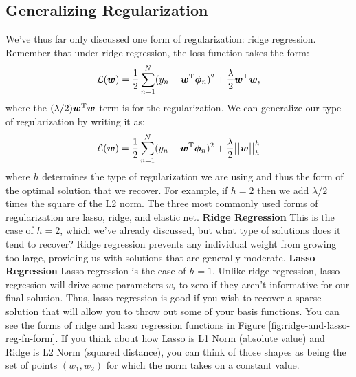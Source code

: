 \subsection{Generalizing Regularization}
We've thus far only discussed one form of regularization: ridge regression. Remember that under ridge regression, the loss function takes the form:
\begin{align*}
    \mathcal{L}(\bm{w}) = \frac{1}{2} \sum_{n=1}^{N} (y_n - \bm{w}^{\mathrm T}\boldsymbol{\phi}_n)^2 + \frac{\lambda}{2}\bm{w}^{\top}\bm{w},
\end{align*}
%
where the $(\lambda/2)\bm{w}^{\mathrm T}\bm{w}$ term is for the regularization. We can generalize our type of regularization by writing it as:
\begin{align*}
    \mathcal{L}(\bm{w}) = \frac{1}{2} \sum_{n=1}^{N} (y_n - \bm{w}^{\mathrm T}\boldsymbol{\phi}_n)^2 + \frac{\lambda}{2}\big|\big|\bm{w}\big|\big|_h^{h}
\end{align*}
where $h$ determines the type of regularization we are using and thus the form of the optimal solution that we recover. For example, if $h=2$ then we add $\lambda/2$ times the square of the L2 norm.
The three most commonly used forms of regularization are lasso, ridge, and elastic net. \newline \newline
\textbf{Ridge Regression} \newline
This is the case of $h = 2$, which we've already discussed, but what type of solutions does it tend to recover? Ridge regression prevents any individual weight from growing too large, providing us with solutions that are generally moderate. \newline \newline
\textbf{Lasso Regression} \newline
Lasso regression is the case of $h = 1$. Unlike ridge regression, lasso regression will drive some parameters $w_i$ to zero if they aren't informative for our final solution. Thus, lasso regression is good if you wish to recover a sparse solution that will allow you to throw out some of your basis functions. You can see the forms of ridge and lasso regression functions in Figure \ref{fig:ridge-and-lasso-reg-fn-form}.
If you think about how Lasso is L1 Norm (absolute value) and Ridge is L2 Norm (squared distance), you can think of those shapes as being the set of points $(w_1,w_2)$ for which the norm takes on a constant value.
%
\newline
\newline

